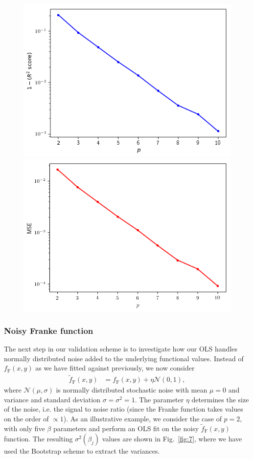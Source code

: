 \documentclass[a4paper, twocolumn]{article}
\newcommand{\fig}[1]{Fig.\ \ref{fig:#1}}
\begin{document}
\begin{figure}
\centering
\includegraphics[width=0.49\linewidth]{OLS_R2.png}
\includegraphics[width=0.49\linewidth]{OLS_MSE.png}
\end{figure}

\subsubsection{Noisy Franke function}
The next step in our validation scheme is to investigate how our OLS handles normally distributed noise added to the underlying functional values. Instead of $f_\text{F}(x,y)$ as we have fitted against previously, we now consider
\begin{align}
\tilde{f}_\text{F}(x,y) &= f_\text{F}(x,y) + \eta \mathcal{N}(0,1),
\end{align}
where $\mathcal{N}(\mu,\sigma)$ is normally distributed stochastic noise with mean $\mu=0$ and variance and standard deviation $\sigma=\sigma^2=1$. The parameter $\eta$ determines the size of the noise, i.e. the signal to noise ratio (since the Franke function takes values on the order of $\propto 1$). As an illustrative example, we consider the case of $p=2$, with only five $\beta$ parameters and perform an OLS fit on the noisy $\tilde{f}_\text{F}(x,y)$ function. The resulting $\sigma^2(\beta_j)$ values are shown in \fig{7}, where we have used the Bootstrap scheme to extract the variances. 
\end{document}
